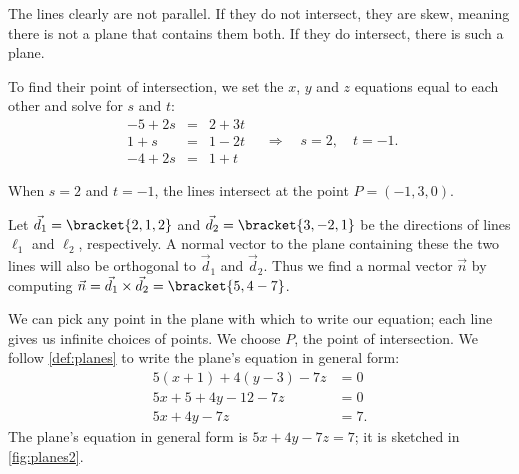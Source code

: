 {The lines clearly are not parallel. If they do not intersect, they are skew, meaning there is not a plane that contains them both. If they do intersect, there is such a plane. 

To find their point of intersection, we set the $x$, $y$ and $z$ equations equal to each other and solve for $s$ and $t$:
\[
 \begin{array}{ccc}-5+2s &=&2+3t \\ 1+s &=& 1-2t \\ -4+2s &=& 1+t \end{array}
 \quad  \Rightarrow  \quad s=2,\quad t=-1.
\]

When $s=2$ and $t=-1$, the lines intersect at the point $P= (-1,3,0)$. 

Let $\vec d_1 =\bracket{2,1,2}$ and $\vec d_2=\bracket{3,-2,1}$ be the directions of lines $\ell_1$ and $\ell_2$, respectively. A normal vector to the plane containing these the two lines will also be orthogonal to $\vec d_1$ and $\vec d_2$. Thus we find a normal vector $\vec n$ by computing $\vec n = \vec d_1 \times \vec d_2=\bracket{5,4-7}$.

We can pick any point in the plane with which to write our equation; each line gives us infinite choices of points. We choose $P$, the point of intersection. We follow \autoref{def:planes} to write the plane's equation in general form:
\begin{align*}
5(x+1) +4(y-3) -7z &= 0 \\
5x + 5 + 4y-12 -7z &= 0\\
5x+4y-7z &= 7.
\end{align*}
The plane's equation in general form is $5x+4y-7z=7$; it is sketched in \autoref{fig:planes2}.}

